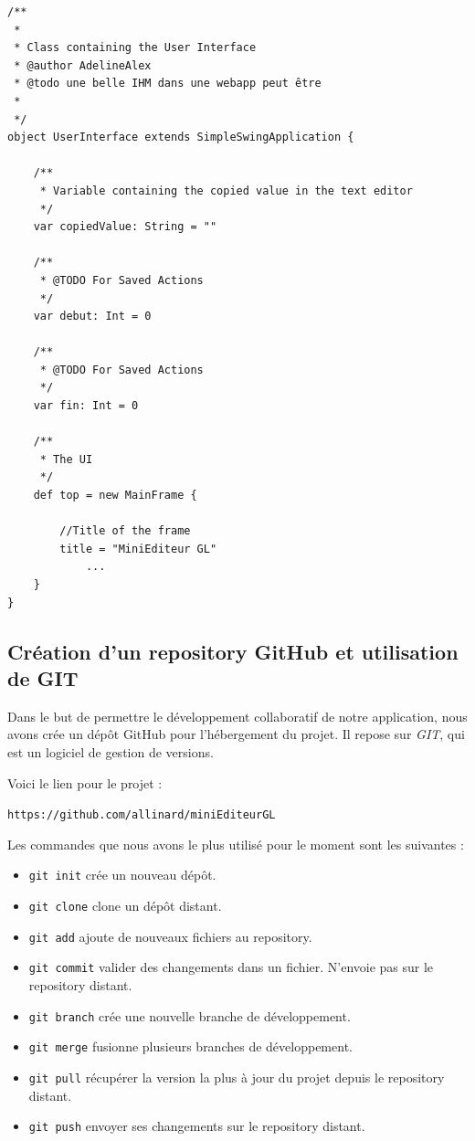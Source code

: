\documentclass[a4paper,11pt]{article}
\begin{document}
	
\newpage
\begin{lstlisting}[caption=Exemple de scaladoc, label=java]
/**
 *
 * Class containing the User Interface
 * @author AdelineAlex
 * @todo une belle IHM dans une webapp peut être
 *
 */
object UserInterface extends SimpleSwingApplication {

	/**
	 * Variable containing the copied value in the text editor
	 */
	var copiedValue: String = ""
	
	/**
	 * @TODO For Saved Actions
	 */
	var debut: Int = 0

	/**
	 * @TODO For Saved Actions
	 */
	var fin: Int = 0

	/**
	 * The UI
	 */
	def top = new MainFrame {

		//Title of the frame
		title = "MiniEditeur GL"
			...
	}
}

\end{lstlisting}	





\subsection{Création d'un repository GitHub et utilisation de GIT}
Dans le but de permettre le développement collaboratif de notre application, nous avons crée un dépôt GitHub pour l'hébergement du projet. Il repose sur \textit{GIT}, qui est un logiciel de gestion de versions.

Voici le lien pour le projet :
\begin{center}
\texttt{https://github.com/allinard/miniEditeurGL}
\end{center}

Les commandes que nous avons le plus utilisé pour le moment sont les suivantes :
\begin{itemize}
		\item \texttt{git init} crée un nouveau dépôt.
		\item \texttt{git clone} clone un dépôt distant.
		\item \texttt{git add} ajoute de nouveaux fichiers au repository.
		\item \texttt{git commit} valider des changements dans un fichier. N'envoie pas sur le repository distant.
		\item \texttt{git branch} crée une nouvelle branche de développement.
		\item \texttt{git merge} fusionne plusieurs branches de développement.
		\item \texttt{git pull} récupérer la version la plus à jour du projet depuis le repository distant.
		\item \texttt{git push} envoyer ses changements sur le repository distant.
\end{itemize}
\end{document}
